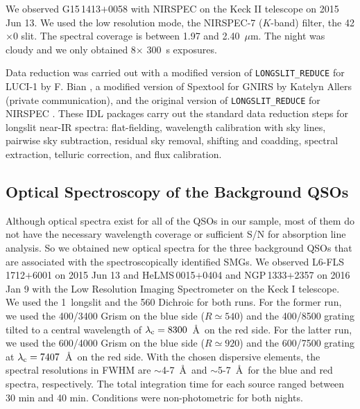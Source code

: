 \documentclass[iop,revtex4,twocolumn,apj,numberedappendix,appendixfloats]{emulateapj}
\newcommand{\um}{$\mu$m}
\begin{document}
We observed G15\,1413$+$0058 with NIRSPEC \citep{McLean98} on the Keck II telescope on 2015 Jun 13. We used the low resolution mode, the NIRSPEC-7 ($K$-band) filter, the 42\arcsec$\times$0 slit. The spectral coverage is between 1.97 and 2.40~\um. The night was cloudy and we only obtained 8$\times$ 300~s exposures.

Data reduction was carried out with a modified version of \texttt{LONGSLIT\_REDUCE} \citep{Becker09} for LUCI-1 by F. Bian \citep{Bian10}, a modified version of Spextool \citep{Cushing04,Vacca03} for GNIRS by Katelyn Allers (private communication), and the original version of \texttt{LONGSLIT\_REDUCE} for NIRSPEC \citep{Becker09}. These IDL packages carry out the standard data reduction steps for longslit near-IR spectra: flat-fielding, wavelength calibration with sky lines, pairwise sky subtraction, residual sky removal, shifting and coadding, spectral extraction, telluric correction, and flux calibration. 

\subsection{Optical Spectroscopy of the Background QSOs}

Although optical spectra exist for all of the QSOs in our sample, most of them do not have the necessary wavelength coverage or sufficient S/N for absorption line analysis. So we obtained new optical spectra for the three background QSOs that are associated with the spectroscopically identified SMGs. We observed L6-FLS\,1712$+$6001 on 2015 Jun 13 and HeLMS\,0015$+$0404 and NGP\,1333$+$2357 on 2016 Jan 9 with the Low Resolution Imaging Spectrometer \citep[LRIS;][]{Oke95} on the Keck I telescope. We used the 1\arcsec\ longslit and the 560 Dichroic for both runs. For the former run, we used the 400/3400 Grism on the blue side ($R \simeq 540$) and the 400/8500 grating tilted to a central wavelength of $\lambda_{\rm c} = 8300$~\AA\ on the red side. 
%
For the latter run, we used the 600/4000 Grism on the blue side ($R \simeq 920$) and the 600/7500 grating at $\lambda_{\rm c} = 7407$~\AA\ on the red side. With the chosen dispersive elements, the spectral resolutions in FWHM are $\sim$4-7~\AA\ and $\sim$5-7~\AA\ for the blue and red spectra, respectively. The total integration time for each source ranged between 30 min and 40 min. Conditions were non-photometric for both nights. 
\end{document}
